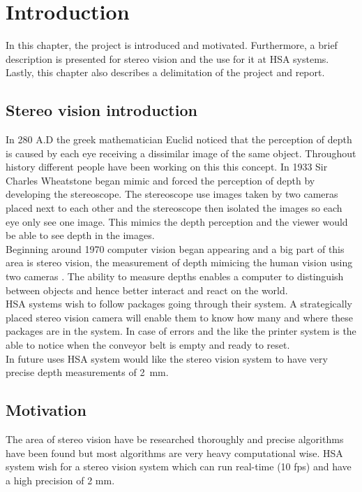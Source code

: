 \chapter{Introduction}\label{ch:introduction}
In this chapter, the project is introduced and motivated. Furthermore, a brief description is presented for stereo vision and the use for it at HSA systems. Lastly, this chapter also describes a delimitation of the project and report.\\

\section{Stereo vision introduction}
In 280 A.D the greek mathematician Euclid noticed that the perception of depth is caused by each eye receiving a dissimilar image of the same object. Throughout history different people have been working on this this concept. In 1933 Sir Charles Wheatstone began mimic and forced the perception of depth by developing the stereoscope. The stereoscope use images taken by two cameras placed next to each other and the stereoscope then isolated the images so each eye only see one image. This mimics the depth perception and the viewer would be able to see depth in the images. \cite{lit:historyofstereophoto}\\

Beginning around 1970 computer vision began appearing and a big part of this area is stereo vision, the measurement of depth mimicing the human vision using two cameras \cite{Szeliski2010}. The ability to measure depths enables a computer to distinguish between objects and hence better interact and react on the world.\\

HSA systems wish to follow packages going through their system. A strategically placed stereo vision camera will enable them to know how many and where these packages are in the system. In case of errors and the like the printer system is the able to notice when the conveyor belt is empty and ready to reset.\\
In future uses HSA system would like the stereo vision system to have very precise depth measurements of \SI{2}{\milli\meter}.

\section{Motivation}
The area of stereo vision have be researched thoroughly and precise algorithms have been found but most algorithms are very heavy computational wise. HSA system wish for a stereo vision system which can run real-time (10 fps) and have a high precision of 2 mm.

